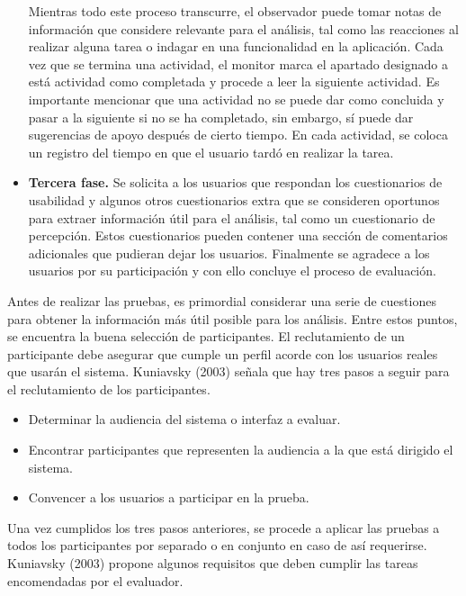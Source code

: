 \begin{itemize}
  Mientras todo este proceso transcurre, el observador puede tomar notas de información que considere relevante para el análisis, tal como las reacciones al realizar alguna tarea o indagar en una funcionalidad en la aplicación. Cada vez que se termina una actividad, el monitor marca el apartado designado a está actividad como completada y procede a leer la siguiente actividad. Es importante mencionar que una actividad no se puede dar como concluida y pasar a la siguiente si no se ha completado, sin embargo, sí puede dar sugerencias de apoyo después de cierto tiempo. En cada actividad, se coloca un registro del tiempo en que el usuario tardó en realizar la tarea.
  \item \textbf{Tercera fase.} Se solicita a los usuarios que respondan los cuestionarios de usabilidad y algunos otros cuestionarios extra que se consideren oportunos para extraer información útil para el análisis, tal como un cuestionario de percepción. Estos cuestionarios pueden contener una sección de comentarios adicionales que pudieran dejar los usuarios. Finalmente se agradece a los usuarios por su participación y con ello concluye el proceso de evaluación.
\end{itemize}

Antes de realizar las pruebas, es primordial considerar una serie de cuestiones para obtener la información más útil posible para los análisis. Entre estos puntos, se encuentra la buena selección de participantes. El reclutamiento de un participante debe asegurar que cumple un perfil acorde con los usuarios reales que usarán el sistema. Kuniavsky (2003) señala que hay tres pasos a seguir para el reclutamiento de los participantes.

\begin{itemize}
  \item Determinar la audiencia del sistema o interfaz a evaluar.
  \item Encontrar participantes que representen la audiencia a la que está dirigido el sistema.
  \item Convencer a los usuarios a participar en la prueba.
\end{itemize}

Una vez cumplidos los tres pasos anteriores, se procede a aplicar las pruebas a todos los participantes por separado o en conjunto en caso de así requerirse. Kuniavsky (2003) propone algunos requisitos que deben cumplir las tareas encomendadas por el evaluador.

